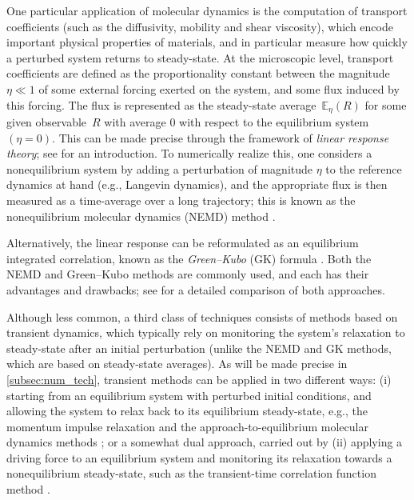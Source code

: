\documentclass[11pt]{article}
\newcommand{\E}{\mathbb{E}}
\theoremstyle{definition}
\begin{document}
One particular application of molecular dynamics is the computation of transport coefficients (such as the diffusivity, mobility and shear viscosity), which encode important physical properties of materials, and in particular measure how quickly a perturbed system returns to steady-state. At the microscopic level, transport coefficients are defined as the proportionality constant between the magnitude $\eta\ll 1$ of some external forcing exerted on the system, and some flux induced by this forcing. The flux is represented as the steady-state average~$\E_\eta(R)$ for some given observable~$R$ with average 0 with respect to the equilibrium system $(\eta=0)$. This can be made precise through the framework of \emph{linear response theory}; see \cite[Chapter 8]{chandler1987} for an introduction. To numerically realize this, one considers a nonequilibrium system by adding a perturbation of magnitude $\eta$ to the reference dynamics at hand (e.g., Langevin dynamics), and the appropriate flux is then measured as a time-average over a long trajectory; this is known as the nonequilibrium molecular dynamics (NEMD) method \cite{ciccotti2005}.

Alternatively, the linear response can be reformulated as an equilibrium integrated correlation, known as the \emph{Green--Kubo} (GK) formula \cite{green1954,kubo1957}. Both the NEMD and Green--Kubo methods are commonly used, and each has their advantages and drawbacks; see \cite{stoltz2024} for a detailed comparison of both approaches. 

Although less common, a third class of techniques consists of methods based on transient dynamics, which typically rely on monitoring the system's relaxation to steady-state after an initial perturbation (unlike the NEMD and GK methods, which are based on steady-state averages). As will be made precise in \cref{subsec:num_tech}, transient methods can be applied in two different ways: (i) starting from an equilibrium system with perturbed initial conditions, and allowing the system to relax back to its equilibrium steady-state, e.g., the momentum impulse relaxation \cite{arya2000} and the approach-to-equilibrium molecular dynamics methods \cite{lampin2013}; or a somewhat dual approach, carried out by (ii) applying a driving force to an equilibrium system and monitoring its relaxation towards a nonequilibrium steady-state, such as the transient-time correlation function method \cite{morriss1987,evans1988}.
\end{document}
